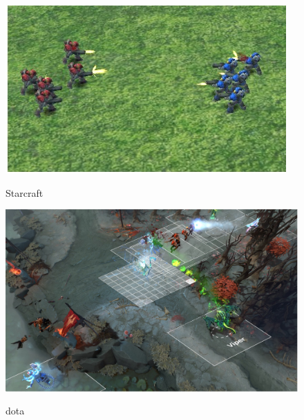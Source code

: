 \documentclass[notheorems, aspectratio=54]{beamer}
\begin{document}
\begin{frame}
\begin{figure}[h]
\begin{minipage}{0.45\textwidth}
    \end{minipage}
  \begin{minipage}{0.45\textwidth}
    \includegraphics[width=\textwidth]{ starcraft.png}
    \begin{center}
    Starcraft
    \end{center}
  \end{minipage}
  \hspace{0.02\linewidth}
  \begin{minipage}{0.45\textwidth}
    \includegraphics[width=\textwidth]{ dota.png}
    \begin{center}
    dota 
    \end{center}
  \end{minipage}
  \end{figure}
  \vfill


\end{frame}
\end{document}
